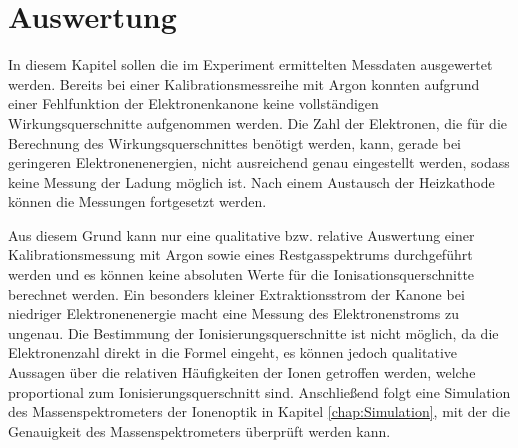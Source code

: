 \chapter{Auswertung}
\label{chap:Auswertung}
In diesem Kapitel sollen die im Experiment ermittelten Messdaten ausgewertet werden. Bereits bei einer Kalibrationsmessreihe mit Argon konnten aufgrund einer Fehlfunktion der Elektronenkanone keine vollständigen Wirkungsquerschnitte aufgenommen werden. Die Zahl der Elektronen, die für die Berechnung des Wirkungsquerschnittes benötigt werden, kann, gerade bei geringeren Elektronenenergien, nicht ausreichend genau eingestellt werden, sodass keine Messung der Ladung möglich ist. Nach einem Austausch der Heizkathode können die Messungen fortgesetzt werden. 

Aus diesem Grund kann nur eine qualitative bzw. relative Auswertung einer Kalibrationsmessung mit Argon sowie eines Restgasspektrums durchgeführt werden und es können keine absoluten Werte für die Ionisationsquerschnitte berechnet werden. Ein besonders kleiner Extraktionsstrom der Kanone bei niedriger Elektronenenergie macht eine Messung des Elektronenstroms zu ungenau. Die Bestimmung der Ionisierungsquerschnitte ist nicht möglich, da die Elektronenzahl direkt in die Formel eingeht, es können jedoch qualitative Aussagen über die relativen Häufigkeiten der Ionen getroffen werden, welche proportional zum Ionisierungsquerschnitt sind. Anschließend folgt eine Simulation des Massenspektrometers der Ionenoptik in Kapitel \ref{chap:Simulation}, mit der die Genauigkeit des Massenspektrometers überprüft werden kann.

